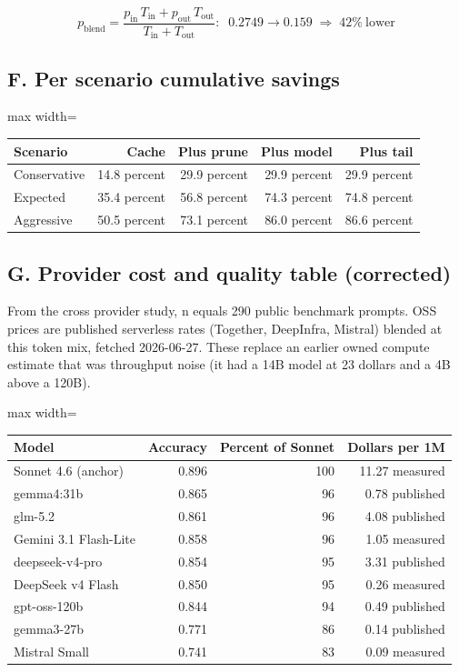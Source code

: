 \documentclass[11pt]{uce-report}
\begin{document}
\[p_{\text{blend}} = \frac{p_{\text{in}}\,T_{\text{in}} + p_{\text{out}}\,T_{\text{out}}}{T_{\text{in}} + T_{\text{out}}}: \;\; 0.2749 \to 0.159 \;\Rightarrow\; 42\%\ \text{lower}\]
\subsection{F. Per scenario cumulative savings}
\vspace{0.4em}
\noindent\begin{adjustbox}{max width=\linewidth}\begin{tabular}{lrrrr}
\toprule
\textbf{Scenario} & \textbf{Cache} & \textbf{Plus prune} & \textbf{Plus model} & \textbf{Plus tail} \\
\midrule
Conservative & 14.8 percent & 29.9 percent & 29.9 percent & 29.9 percent \\
Expected & 35.4 percent & 56.8 percent & 74.3 percent & 74.8 percent \\
Aggressive & 50.5 percent & 73.1 percent & 86.0 percent & 86.6 percent \\
\bottomrule
\end{tabular}\end{adjustbox}

\subsection{G. Provider cost and quality table (corrected)}
From the cross provider study, n equals 290 public benchmark prompts. OSS prices are published serverless rates (Together, DeepInfra, Mistral) blended at this token mix, fetched 2026-06-27. These replace an earlier owned compute estimate that was throughput noise (it had a 14B model at 23 dollars and a 4B above a 120B).


\vspace{0.4em}
\noindent\begin{adjustbox}{max width=\linewidth}\begin{tabular}{p{5.5cm}rrr}
\toprule
\textbf{Model} & \textbf{Accuracy} & \textbf{Percent of Sonnet} & \textbf{Dollars per 1M} \\
\midrule
Sonnet 4.6 (anchor) & 0.896 & 100 & 11.27 measured \\
gemma4:31b & 0.865 & 96 & 0.78 published \\
glm-5.2 & 0.861 & 96 & 4.08 published \\
Gemini 3.1 Flash-Lite & 0.858 & 96 & 1.05 measured \\
deepseek-v4-pro & 0.854 & 95 & 3.31 published \\
DeepSeek v4 Flash & 0.850 & 95 & 0.26 measured \\
gpt-oss-120b & 0.844 & 94 & 0.49 published \\
gemma3-27b & 0.771 & 86 & 0.14 published \\
Mistral Small & 0.741 & 83 & 0.09 measured \\
\bottomrule
\end{tabular}\end{adjustbox}
\end{document}
